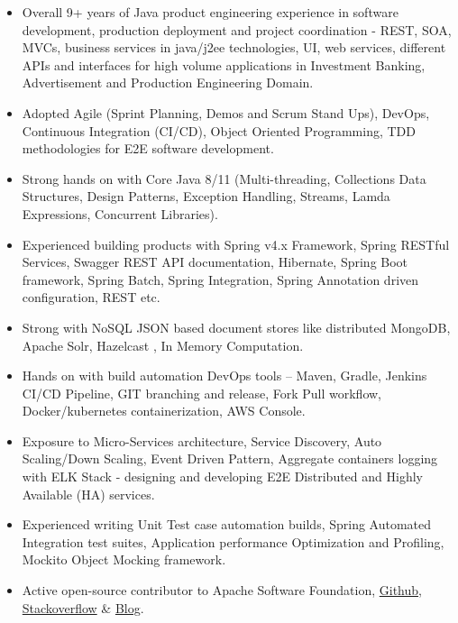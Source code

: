 \documentclass[10pt,A4]{article}
\begin{document}
\begin{itemize}
\item Overall 9+ years of Java product engineering experience in software development, 
production deployment and project coordination - REST, SOA,
MVCs, business services in java/j2ee technologies, UI, web services, different APIs and
interfaces for high volume applications in Investment Banking, Advertisement and Production Engineering Domain.

\item Adopted Agile (Sprint Planning, Demos and Scrum Stand Ups), DevOps, Continuous Integration (CI/CD),
Object Oriented Programming, TDD methodologies for E2E software development.

\item Strong hands on with Core Java 8/11 (Multi-threading, Collections Data Structures, Design Patterns,
Exception Handling, Streams, Lamda Expressions, Concurrent Libraries).

\item Experienced building products with Spring v4.x Framework, Spring RESTful Services, 
Swagger REST API documentation, Hibernate, Spring Boot framework, Spring Batch, Spring Integration, 
Spring Annotation driven configuration, REST etc.

\item Strong with NoSQL JSON based document stores like distributed MongoDB, Apache Solr, Hazelcast , In Memory Computation.

\item Hands on with build automation DevOps tools – Maven, Gradle, Jenkins CI/CD Pipeline, GIT branching
and release, Fork Pull workflow, Docker/kubernetes containerization, AWS Console.

\item Exposure to Micro-Services architecture, Service Discovery, Auto Scaling/Down Scaling, Event Driven
Pattern, Aggregate containers logging with ELK Stack - designing and developing E2E Distributed and
Highly Available (HA) services.

\item Experienced writing Unit Test case automation builds, Spring Automated Integration test suites,
Application performance Optimization and Profiling, Mockito Object Mocking framework.

\item Active open-source contributor to Apache Software Foundation, \href{http://github.com/ameyjadiye/}{Github}, \href{https://stackoverflow.com/users/2664649/amey-jadiye}{Stackoverflow} \& \href{http://codeinventory.com}{Blog}.
\end{itemize} 
\end{document}
